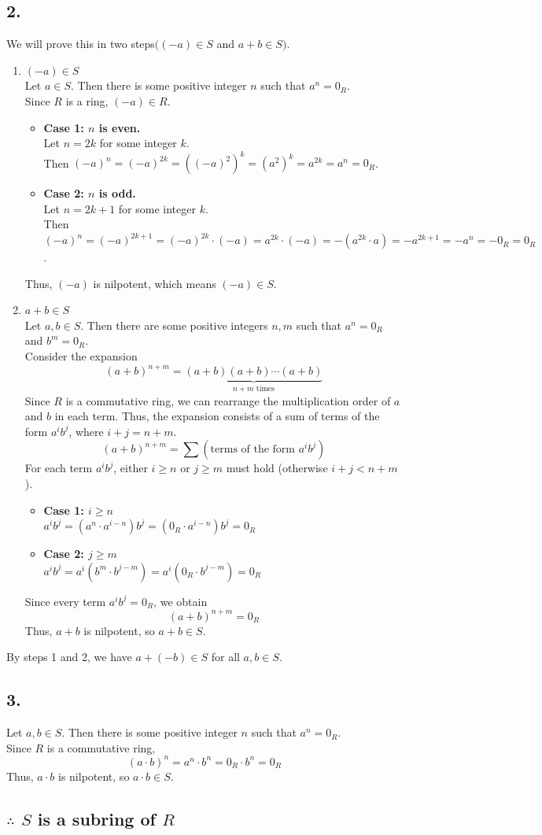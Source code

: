 \documentclass[11pt, a4paper]{article}
\begin{document}
\subsection*{2.}
We will prove this in two steps$((-a) \in S$ and $a+b \in S)$.
\begin{enumerate}
    \item $(-a) \in S$\\[5pt]
    Let $a \in S$. Then there is some positive integer $n$ such that $a^n = 0_R$. \\
    Since $R$ is a ring, $(-a) \in R$.
    \begin{itemize}
        \item[--] \textbf{Case 1: $n$ is even.} \\
        Let $n = 2k$ for some integer $k$. \\
        Then $(-a)^n = (-a)^{2k} = ((-a)^2)^k = (a^2)^k = a^{2k} = a^n = 0_R$.
        \item[--] \textbf{Case 2: $n$ is odd.} \\
        Let $n = 2k+1$ for some integer $k$. \\
        Then $(-a)^n = (-a)^{2k+1} = (-a)^{2k}\cdot(-a) = a^{2k}\cdot(-a) = -(a^{2k}\cdot a) = -a^{2k+1} = -a^n = -0_R = 0_R$.
    \end{itemize}
    Thus, $(-a)$ is nilpotent, which means $(-a) \in S$.
    
    \item $a+b \in S$\\[5pt]
    Let $a, b \in S$. Then there are some positive integers $n, m$ such that $a^n = 0_R$ and $b^m = 0_R$. \\
    Consider the expansion
    \[
    (a+b)^{n+m} = \underbrace{(a+b)(a+b)\cdots(a+b)}_{n+m \text{ times}}
    \]
    Since $R$ is a commutative ring, we can rearrange the multiplication order of $a$ and $b$ in each term. Thus, the expansion consists of a sum of terms of the form $a^i b^j$, where $i+j = n+m$.
    \[
    (a+b)^{n+m} = \sum (\text{terms of the form } a^i b^j)
    \]
    For each term $a^i b^j$, either $i \ge n$ or $j \ge m$ must hold (otherwise $i+j < n+m$).
    \begin{itemize}
        \item[--] \textbf{Case 1: $i \ge n$} \\
        $a^ib^j = (a^n \cdot a^{i-n})b^j = (0_R \cdot a^{i-n})b^j = 0_R$
        \item[--] \textbf{Case 2: $j \ge m$} \\
        $a^ib^j = a^i(b^m \cdot b^{j-m}) = a^i(0_R \cdot b^{j-m}) = 0_R$
    \end{itemize}
    Since every term $a^ib^j = 0_R$, we obtain
    \[
    (a+b)^{n+m} = 0_R
    \]
    Thus, $a+b$ is nilpotent, so $a+b \in S$.
\end{enumerate}
By steps 1 and 2, we have $a + (-b) \in S$ for all $a, b \in S$.

\subsection*{3.}
Let $a, b \in S$. Then there is some positive integer $n$ such that $a^n = 0_R$. \\
Since $R$ is a commutative ring,
\[
(a \cdot b)^n = a^n \cdot b^n = 0_R \cdot b^n = 0_R
\]
Thus, $a \cdot b$ is nilpotent, so $a \cdot b \in S$.

\subsection*{$\therefore$ $S$ is a subring of $R$}
\end{document}

